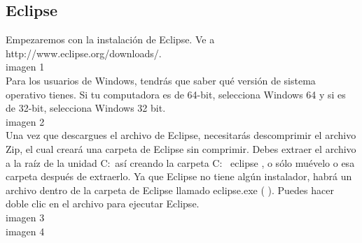 \subsection{Eclipse}
Empezaremos con la instalación de Eclipse. Ve a http://www.eclipse.org/downloads/.\\
	imagen 1 \\
Para los usuarios de Windows, tendrás que saber qué versión de sistema operativo tienes. Si tu computadora es de 64-bit, selecciona Windows 64 y si es de 32-bit, selecciona Windows 32 bit. \\
	imagen 2\\
Una vez que descargues el archivo de Eclipse, necesitarás descomprimir el archivo Zip, el cual creará una carpeta de Eclipse sin comprimir. Debes extraer el archivo a la raíz de la unidad C:\, así creando la carpeta C: \ eclipse , o sólo muévelo o esa carpeta después de extraerlo. Ya que Eclipse no tiene algún instalador, habrá un archivo dentro de la carpeta de Eclipse llamado eclipse.exe ( ). Puedes hacer doble clic en el archivo para ejecutar Eclipse.\\
	imagen 3\\
	imagen 4\\